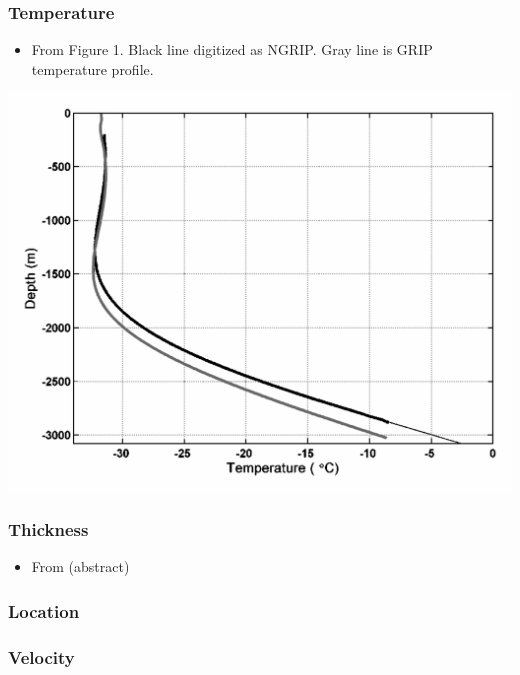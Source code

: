 \documentclass[article,a4paper,times,11pt,twoside]{article}
\begin{document}
\subsubsection{Temperature}
\label{sec:org5b52428}

\begin{itemize}
\item From \textcite{dahl-jensen_2003} Figure 1. Black line digitized as NGRIP. Gray line is GRIP temperature profile.
\end{itemize}
\begin{center}
\includegraphics[width=.9\linewidth]{ngrip/dahl-jensen_2003_fig1.png}
\end{center}

\subsubsection{Thickness}
\label{sec:org592fae6}

\begin{itemize}
\item From \textcite{dahl-jensen_2003} (abstract)
\end{itemize}

\subsubsection{Location}
\label{sec:orgfa1805a}

\subsubsection{Velocity}
\label{sec:orgf460d20}
\clearpage
\end{document}
